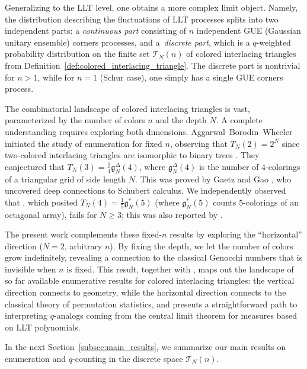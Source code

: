 \documentclass[10pt,a4paper]{amsart}
\numberwithin{equation}{section}
\theoremstyle{definition}
\begin{document}
Generalizing to the LLT level, one obtains a more complex limit object.
Namely, the distribution describing the fluctuations of LLT processes splits
into two independent parts: a \emph{continuous part}
consisting of $n$
independent GUE (Gaussian unitary ensemble) corners processes, and a~\emph{discrete part}, which is a $q$-weighted probability distribution on the
finite set $\mathcal{T}_N(n)$ of colored interlacing triangles from
Definition~\ref{def:colored_interlacing_triangle}.
The discrete part is nontrivial for $n>1$, while for $n=1$ (Schur case), one simply has
a single GUE corners process.

The combinatorial landscape of colored interlacing triangles is vast,
parameterized by the number of colors $n$ and the depth $N$.
A complete understanding requires exploring both dimensions.
Aggarwal--Borodin--Wheeler \cite{ABW2023coloured_LLT} initiated the study of
enumeration for fixed $n$, observing that $T_N(2) = 2^N$ since two-colored
interlacing triangles are isomorphic to binary trees
\cite[Proposition~A.1]{ABW2023coloured_LLT}.
They conjectured \cite[Conjecture~A.3]{ABW2023coloured_LLT} that
$T_N(3) = \frac{1}{4}\mathfrak{g}_N^{\Delta}(4)$, where
$\mathfrak{g}_N^{\Delta}(4)$ \cite[A153467]{OEIS} is the number of $4$-colorings
of a triangular grid of side length $N$.
This was proved by Gaetz and Gao \cite{gaetz2023bijection}, who uncovered deep
connections to Schubert calculus.
We independently observed that \cite[Conjecture~A.5]{ABW2023coloured_LLT}, which
posited $T_N(4) = \frac{1}{5}\mathfrak{g}_N^{*}(5)$ (where
$\mathfrak{g}_N^{*}(5)$ \cite[A068294]{OEIS} counts $5$-colorings of an
octagonal array), fails for $N \ge 3$; this was also reported by
\cite{gaetz2023bijection}.

The present work complements these fixed-$n$ results by exploring the
``horizontal'' direction ($N=2$, arbitrary $n$).
By fixing the depth, we let the number of colors grow indefinitely, revealing a
connection to the classical Genocchi numbers that is invisible when $n$ is
fixed.
This result, together with \cite{gaetz2023bijection}, maps out the landscape of
so far available enumerative results for colored interlacing triangles: the
vertical direction connects to geometry, while the horizontal direction connects
to the classical theory of permutation statistics, and presents a
straightforward path to interpreting $q$-analogs coming from the central limit
theorem for measures based on LLT polynomials.

In the next Section~\ref{subsec:main_results}, we summarize our main results on
enumeration and $q$-counting in the discrete space $\mathcal{T}_N(n)$.
\end{document}
